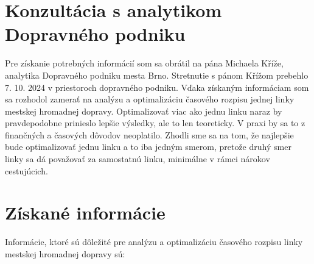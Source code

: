 \section{Konzultácia s analytikom Dopravného podniku}
Pre získanie potrebných informácií som sa obrátil na pána Michaela Kříže, analytika Dopravného podniku mesta Brno.
Stretnutie s pánom Křížom prebehlo 7. 10. 2024 v priestoroch dopravného podniku.
Vďaka získaným informáciam som sa rozhodol zamerať na analýzu a optimalizáciu časového rozpisu jednej linky mestskej hromadnej dopravy.
Optimalizovať viac ako jednu linku naraz by pravdepodobne prinieslo lepšie výsledky, ale to len teoreticky.
V praxi by sa to z finančných a časových dôvodov neoplatilo.
Zhodli sme sa na tom, že najlepšie bude optimalizovať jednu linku a to iba jedným smerom, pretože druhý smer linky sa dá považovať za samostatnú linku, minimálne v rámci nárokov cestujúcich.

\section{Získané informácie}

Informácie, ktoré sú dôležité pre analýzu a optimalizáciu časového rozpisu linky mestskej hromadnej dopravy sú:

